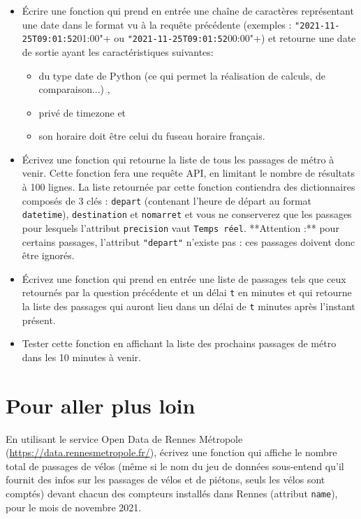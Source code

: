 \documentclass[11pt,a4paper]{article}
\begin{document}
\begin{itemize}
    \item Écrire une fonction qui prend en entrée une chaîne de caractères 
        représentant une date dans le format vu à la requête précédente (exemples : 
        \verb+"2021-11-25T09:01:52+01:00"+  ou \verb+"2021-11-25T09:01:52+00:00"+)
        et retourne une date de sortie ayant les caractéristiques suivantes:
        \begin{itemize}
            \item du type date de Python (ce qui permet la réalisation de calculs, de comparaison...) ,
            \item privé de timezone et
            \item son horaire doit être celui du fuseau horaire français.
        \end{itemize}
    \item Écrivez une fonction qui retourne la liste de tous les passages de métro à
        venir. Cette fonction fera une requête API, en limitant le nombre de résultats à 100 lignes. 
        La liste retournée par cette fonction contiendra des dictionnaires composés de 3 clés : 
        \verb+depart+ (contenant l'heure de départ au format \verb+datetime+), \verb+destination+ et \verb+nomarret+ 
        et vous ne conserverez que les passages pour lesquels l'attribut \verb+precision+ vaut \verb+Temps réel+.
        **Attention :** pour certains passages, l'attribut \verb+"depart"+ n'existe pas :
        ces passages doivent donc être ignorés.
    \item Écrivez une fonction qui prend en entrée une liste de passages tels que ceux retournés par la question 
        précédente et un délai \verb+t+ en minutes et qui retourne la liste des passages qui auront lieu dans un délai de \verb+t+ 
        minutes après l'instant présent. 
    \item Tester cette fonction en affichant la liste des prochains passages de métro dans 
        les 10 minutes à venir.
\end{itemize}

\section{Pour aller plus loin}

En utilisant le service Open Data de Rennes Métropole (\url{https://data.rennesmetropole.fr/}), écrivez une
fonction qui affiche le nombre total de passages de vélos (même si le nom du jeu de données 
sous-entend qu'il fournit des infos sur les passages de vélos et de piétons, seuls les vélos 
sont comptés) devant chacun des 
compteurs installés dans Rennes (attribut \verb+name+), pour le mois de novembre 2021.
\end{document}
